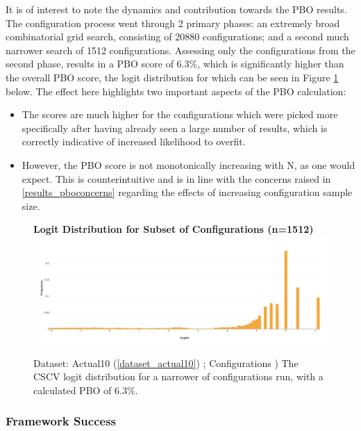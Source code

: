 \documentclass[a4paper,11pt,oneside]{article}
\theoremstyle{plain}
\theoremstyle{definition}
\begin{document}
	
	It is of interest to note the dynamics and contribution towards the PBO results. The configuration process went through 2 primary phases: an extremely broad combinatorial grid search, consisting of 20880 configurations; and a second much narrower search of 1512 configurations. Assessing only the configurations from the second phase, results in a PBO score of 6.3\%, which is significantly higher than the overall PBO score, the logit distribution for which can be seen in Figure \ref{figure-results_logits_subset} below. The effect here highlights two important aspects of the PBO calculation:
	\begin{itemize}
		\item[1] The scores are much higher for the configurations which were picked more specifically after having already seen a large number of results, which is correctly indicative of increased likelihood to overfit.
		\item[2] However, the PBO score is not monotonically increasing with N, as one would expect. This is counterintuitive and is in line with the concerns raised in \ref{results_pboconcerns} regarding the effects of increasing configuration sample size.
	\end{itemize}
	
	\begin{figure}[H]
		\centering 
		\textbf{Logit Distribution for Subset of Configurations (n=1512)}
		\includegraphics[scale=0.25]{images/results/pbo/subset_dist.png} 
		\caption[Logit Distribution for Subset of Configurations]{Dataset: Actual10 (\ref{dataset_actual10}) ; Configurations )
			\newline The CSCV logit distribution for a narrower of configurations run, with a calculated PBO of 6.3\%.}
		\label{figure-results_logits_subset}
	\end{figure}
	
	
	\subsubsection{Framework Success}
	
\end{document}
